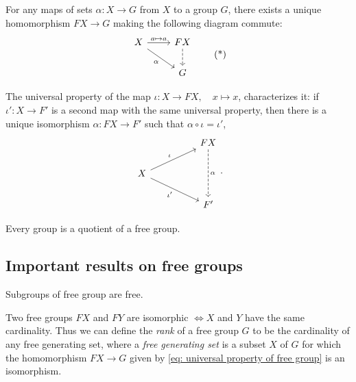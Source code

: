 \begin{proposition}
  For any maps of sets \( \alpha: X \to G \) from \( X \) to a group \( G \), there exists a unique homomorphism \( FX \to G \) making the following diagram commute:
  \begin{equation}
    \begin{tikzcd}
      X & FX \\
      & G
      \arrow["{a \mapsto a}", from=1-1, to=1-2]
      \arrow["\alpha"', from=1-1, to=2-2]
      \arrow[dashed, from=1-2, to=2-2]
    \end{tikzcd}
    \tag{*}\label{eq: universal property of free group}
  \end{equation}
\end{proposition}
\begin{remark}
  The universal property of the map \( \iota: X \to FX,\quad x \mapsto x \), characterizes it: if \( \iota': X \to F' \) is a second map with the same universal property, then there is a unique isomorphism \( \alpha: FX \to F' \) such that \( \alpha  \circ \iota = \iota' \),
  \[\begin{tikzcd}
    && FX \\
    X \\
    && {F'}
    \arrow["\alpha", dashed, from=1-3, to=3-3]
    \arrow["\iota", from=2-1, to=1-3]
    \arrow["{\iota'}"', from=2-1, to=3-3]
  \end{tikzcd}.\]
\end{remark}

\begin{corollary}
  Every group is a quotient of a free group.
\end{corollary}

\subsection{Important results on free groups}

\begin{theorem}
  Subgroups of free group are free.
\end{theorem}

\begin{proposition}
  Two free groups \( FX \) and \( FY \) are isomorphic \( \iff X \) and \( Y \)
  have the same cardinality. Thus we can define the \emph{rank} of a free group
  \( G \) to be the cardinality of any free generating set, where a \emph{free
  generating set} is a subset \( X \) of \( G \) for which the homomorphism \(
  FX \to G \) given by \eqref{eq: universal property of free group} is an
  isomorphism.
\end{proposition}

